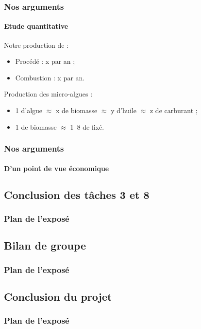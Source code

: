 \documentclass{beamer}
\begin{document}
	\begin{frame}
		\frametitle{Nos arguments}
		\framesubtitle{Etude quantitative}
		Notre production de  :
		\begin{itemize}
			\item Procédé : \unit{x}{\ton} par an ;
			\item Combustion : \unit{x}{\ton} par an.
		\end{itemize}
		Production des micro-algues :
		\begin{itemize} 
			\item \unit{1}{\hectare} d'algue $\approx$ \unit{x}{\kilo\gram} de biomasse $\approx$
			\unit{y}{\kilo\gram} d'huile $\approx$ \unit{z}{\liter} de carburant ;
			\item \unit{1}{\kilo\gram} de biomasse $\approx$ \unit{1.8}{\kilo\gram}
			de  fixé.
		\end{itemize}
	\end{frame}

	\begin{frame}
		\frametitle{Nos arguments}
		\framesubtitle{D'un point de vue économique}
		
	\end{frame}

	\begin{frame}
		\section{Conclusion des tâches 3 et 8}
		\frametitle{Plan de l'exposé}
		\tableofcontents[currentsubsection,sectionstyle=show/shaded,subsectionstyle=show/shaded/hide]
	\end{frame}
	
	\begin{frame}
		\section{Bilan de groupe}
		\frametitle{Plan de l'exposé}
		\tableofcontents[currentsubsection,sectionstyle=show/shaded,subsectionstyle=show/shaded/hide]
	\end{frame}
	
	\begin{frame}
	\end{frame}
	
	\begin{frame}
		\section{Conclusion du projet}
		\frametitle{Plan de l'exposé}
		\tableofcontents[currentsubsection,sectionstyle=show/shaded,subsectionstyle=show/shaded/hide]
	\end{frame}
	
	\begin{frame}
	\end{frame}
	
\end{document}
